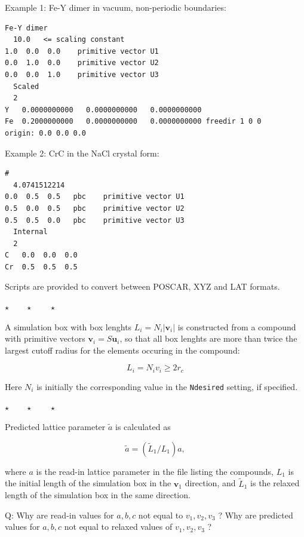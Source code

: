 \documentclass[a4paper,12pt,pdftex,onecolumn]{article}
\newcommand{\stars}{\begin{center}%
\vspace{1em plus 0.5em minus 0.5em}%
$\star \qquad \star \qquad \star$%
\vspace{1em plus 0.5em minus 0.5em}%
\end{center}}
\begin{document}
Example 1: Fe-Y dimer in vacuum, non-periodic boundaries:

\begin{Verbatim}[fontsize=\relsize{-1},frame=single]
Fe-Y dimer
  10.0   <= scaling constant
1.0  0.0  0.0    primitive vector U1
0.0  1.0  0.0    primitive vector U2
0.0  0.0  1.0    primitive vector U3
  Scaled
  2
Y   0.0000000000   0.0000000000   0.0000000000
Fe  0.2000000000   0.0000000000   0.0000000000 freedir 1 0 0
origin: 0.0 0.0 0.0
\end{Verbatim}


Example 2: CrC in the NaCl crystal form:

\begin{Verbatim}[fontsize=\relsize{-1},frame=single]
#
  4.0741512214
0.0  0.5  0.5   pbc    primitive vector U1
0.5  0.0  0.5   pbc    primitive vector U2
0.5  0.5  0.0   pbc    primitive vector U3
  Internal
  2
C   0.0  0.0  0.0
Cr  0.5  0.5  0.5
\end{Verbatim}


Scripts are provided to convert between POSCAR, XYZ and LAT formats.


\stars

A simulation box with box lenghts $L_i = N_i |\mathbf{v}_i|$ is constructed from
a compound with primitive vectors $\mathbf{v}_i = S \mathbf{u}_i$,
so that all box lenghts are more than twice the largest cutoff radius
for the elements occuring in the compound:

\begin{equation}
L_i = N_i v_i \ge 2 r_c
\end{equation}

Here $N_i$ is initially the corresponding value in the \verb+Ndesired+ setting,
if specified.

\stars

Predicted lattice parameter $\widetilde{a}$ is calculated as

\begin{equation}
\widetilde{a} = (\widetilde{L}_1 / L_1) a,
\end{equation}

where $a$ is the read-in lattice parameter in the file listing the compounds,
$L_1$ is the initial length of the simulation box in the $\mathbf{v}_1$ direction, and
$\widetilde{L}_1$ is the relaxed length of the simulation box in the same direction.

Q: Why are read-in values for $a,b,c$ not equal to $v_1,v_2,v_3$ ?
Why are predicted values for $a,b,c$ not equal to relaxed values of $v_1,v_2,v_3$ ?
\end{document}
